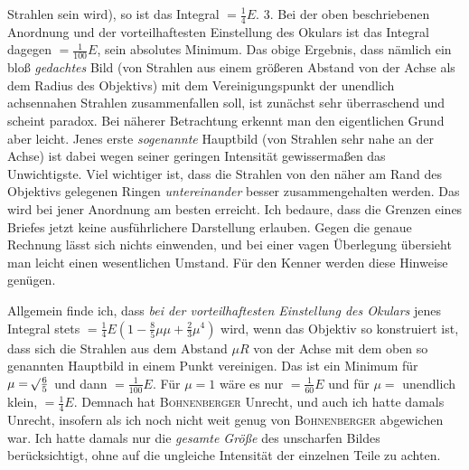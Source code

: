 Strahlen sein wird), so ist das Integral $=\tfrac14E$. 3. Bei der oben beschriebenen Anordnung und der vorteilhaftesten Einstellung des Okulars ist das Integral dagegen $=\tfrac{1}{100}E$, sein absolutes Minimum. Das obige Ergebnis, dass nämlich ein bloß \textit{gedachtes} Bild (von Strahlen aus einem größeren Abstand von der Achse als dem Radius des Objektivs) mit dem Vereinigungspunkt der unendlich achsennahen Strahlen zusammenfallen soll, ist zunächst sehr überraschend und scheint paradox. Bei näherer Betrachtung erkennt man den eigentlichen Grund aber leicht. Jenes erste \textit{sogenannte} Hauptbild (von Strahlen sehr nahe an der Achse) ist dabei wegen seiner geringen Intensität gewissermaßen das Unwichtigste. Viel wichtiger ist, dass die Strahlen von den näher am Rand des Objektivs gelegenen Ringen \textit{untereinander} besser zusammengehalten werden. Das wird bei jener Anordnung am besten erreicht. Ich bedaure, dass die Grenzen eines Briefes jetzt keine ausführlichere Darstellung erlauben. Gegen die genaue Rechnung lässt sich nichts einwenden, und bei einer vagen Überlegung übersieht man leicht einen wesentlichen Umstand. Für den Kenner werden diese Hinweise genügen.

Allgemein finde ich, dass \textit{bei der vorteilhaftesten Einstellung des Okulars} jenes Integral stets $=\tfrac14E(1-\tfrac85\mu\mu+\tfrac23\mu^4)$ wird, wenn das Objektiv so konstruiert ist, dass sich die Strahlen aus dem Abstand $\mu R$ von der Achse mit dem oben so genannten Hauptbild in einem Punkt vereinigen. Das ist ein Minimum für $\mu=\mathord{{}^{}\!\surd}\tfrac65$ und dann $=\tfrac{1}{100}E$. Für $\mu=1$ wäre es nur $=\tfrac{1}{60}E$ und für $\mu=$ unendlich klein, $=\tfrac14E$. Demnach hat \textsc{Bohnenberger} Unrecht, und auch ich hatte damals Unrecht, insofern als ich noch nicht weit genug von \textsc{Bohnenberger} abgewichen war. Ich hatte damals nur die \textit{gesamte Größe} des unscharfen Bildes berücksichtigt, ohne auf die ungleiche Intensität der einzelnen Teile zu achten.

